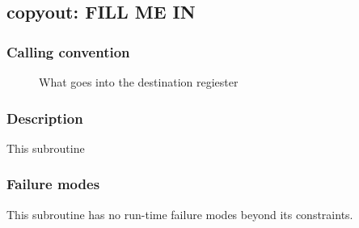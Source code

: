 \clearpage
{}
{}
\label{subr:copyout}
\subsection*{copyout: FILL ME IN}

\subsubsection*{Calling convention}

\begin{description}
\item[] What goes into the destination regiester
\end{description}

\subsubsection*{Description}

This subroutine 

\subsubsection*{Failure modes}

This subroutine has no run-time failure modes beyond its constraints.
